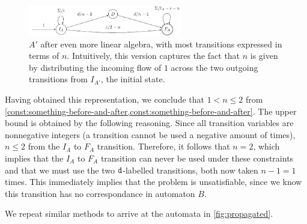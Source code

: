 \begin{figure}[h]
  \centering 
  \includegraphics[width=0.6\textwidth]{a_2}
  \caption{ $A'$ after even more linear algebra, with most transitions expressed
  in terms of $n$. Intuitively, this version captures the fact that $n$ is given
  by distributing the incoming flow of $1$ across the two outgoing transitions
  from $I_{A'}$, the initial state.}
  \label{fig:a_2}
\end{figure}

Having obtained this representation, we conclude that $1 < n \leq 2$ from
\cref{const:something-before-and-after,const:something-before-and-after}. The
upper bound is obtained by the following reasoning. Since all transition
variables are nonnegative integers (a transition cannot be used a negative
amount of times), $n \leq 2$ from the $I_A$ to $F_A$ transition. Therefore, it
follows that $n=2$, which implies that the $I_A$ to $F_A$ transition can never
be used under these constraints and that we must use the two $\texttt{d}$-labelled
transitions, both now taken $n-1 =1$ times. This immediately implies that the problem is
unsatisfiable, since we know this transition has no correspondance in automaton
$B$.

We repeat similar methods to arrive at the automata in \cref{fig:propagated}.

